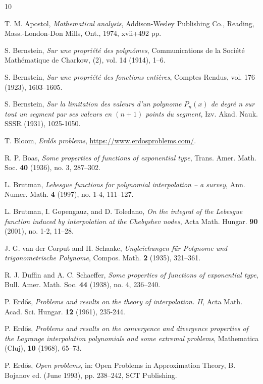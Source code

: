 \documentclass[12pt]{amsart}
\begin{document}
\begin{thebibliography}{10}

T. M. Apostol, \emph{Mathematical analysis}, Addison-Wesley Publishing Co., Reading, Mass.-London-Don Mills, Ont., 1974, xvii+492 pp.

S. Bernstein, \emph{Sur une propri\'et\'e des polyn\'omes}, Communications de la Soci\'et\'e Mathématique de Charkow, (2), vol. 14 (1914), 1--6.

S. Bernstein, \emph{Sur une propri\'et\'e des fonctions enti\`eres}, Comptes Rendus, vol. 176 (1923), 1603--1605.

S. Bernstein, \emph{Sur la limitation des valeurs d'un polynome $P_n(x)$ de degré n sur tout un segment par ses valeurs en $(n+1)$ points du segment}, Izv. Akad. Nauk. SSSR (1931), 1025-1050.

T. Bloom, \emph{Erd\H{o}s problems}, \url{https://www.erdosproblems.com/}.

R. P. Boas, \emph{Some properties of functions of exponential type}, Trans. Amer. Math. Soc. \textbf{40} (1936), no. 3, 287--302.

L. Brutman, \emph{Lebesgue functions for polynomial interpolation -- a survey}, Ann. Numer. Math. \textbf{4} (1997), no. 1-4, 111--127.

L. Brutman, I. Gopengauz, and D. Toledano, \emph{On the integral of the Lebesgue function induced by interpolation at the Chebyshev nodes}, Acta Math. Hungar. \textbf{90} (2001), no. 1-2, 11--28.

J. G. van der Corput and H. Schaake, \emph{Ungleichungen für Polynome und trigonometrische Polynome}, Compos. Math. \textbf{2} (1935), 321--361.

R. J. Duffin and A. C. Schaeffer, \emph{Some properties of functions of exponential type}, Bull. Amer. Math. Soc. \textbf{44} (1938), no. 4, 236--240.

P. Erd\H{o}s, \emph{Problems and results on the theory of interpolation. II}, Acta Math. Acad. Sci. Hungar. \textbf{12} (1961), 235-244.

P. Erd\H{o}s, \emph{Problems and results on the convergence and divergence properties of the Lagrange interpolation polynomials and some extremal problems}, Mathematica (Cluj), \textbf{10} (1968), 65--73.

P. Erd\H{o}s, \emph{Open problems}, in: Open Problems in Approximation Theory, B. Bojanov ed. (June 1993), pp. 238--242, SCT Publishing.


\end{thebibliography}
\end{document}
